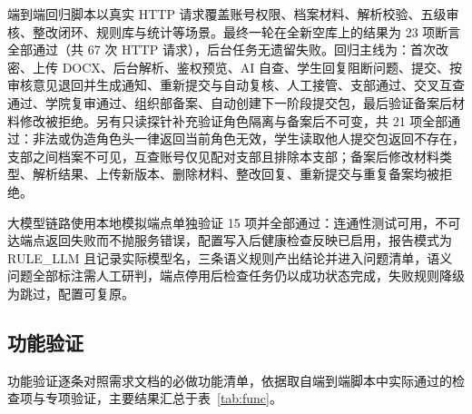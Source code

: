 \documentclass[12pt,a4paper]{ctexart}
\begin{document}
端到端回归脚本以真实 HTTP 请求覆盖账号权限、档案材料、解析校验、五级审核、整改闭环、规则库与统计等场景。最终一轮在全新空库上的结果为 23 项断言全部通过（共 67 次 HTTP 请求），后台任务无遗留失败。回归主线为：首次改密、上传 DOCX、后台解析、鉴权预览、AI 自查、学生回复阻断问题、提交、按审核意见退回并生成通知、重新提交与自动复核、人工接管、支部通过、交叉互查通过、学院复审通过、组织部备案、自动创建下一阶段提交包，最后验证备案后材料修改被拒绝。另有只读探针补充验证角色隔离与备案后不可变，共 21 项全部通过：非法或伪造角色头一律返回当前角色无效，学生读取他人提交包返回不存在，支部之间档案不可见，互查账号仅见配对支部且排除本支部；备案后修改材料类型、解析结果、上传新版本、删除材料、整改回复、重新提交与重复备案均被拒绝。

大模型链路使用本地模拟端点单独验证 15 项并全部通过：连通性测试可用，不可达端点返回失败而不抛服务错误，配置写入后健康检查反映已启用，报告模式为 RULE\_LLM 且记录实际模型名，三条语义规则产出结论并进入问题清单，语义问题全部标注需人工研判，端点停用后检查任务仍以成功状态完成，失败规则降级为跳过，配置可复原。

\subsection{功能验证}

功能验证逐条对照需求文档的必做功能清单，依据取自端到端脚本中实际通过的检查项与专项验证，主要结果汇总于表~\ref{tab:func}。
\end{document}
